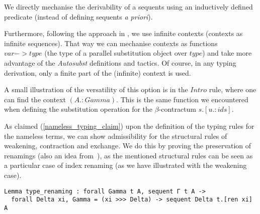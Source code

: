 We directly mechanise the derivability of a sequents using an inductively defined predicate (instead of defining sequents \textit{a priori}).

Furthermore, following the approach in \cite{AutosubstManual}, we use infinite contexts (contexts as infinite sequences).
That way we can mechanise contexts as functions \lst$var->type$ (the type of a parallel substitution object over \lst$type$) and take more advantage of the \textit{Autosubst} definitions and tactics.
Of course, in any typing derivation, only a finite part of the (infinite) context is used.

A small illustration of the versatility of this option is in the \lst$Intro$ rule, where one can find the context \lst$(A.:Gamma)$.
This is the same function we encountered when defining the substitution operation for the $\beta$-contractum \lst$s.[u.:ids]$.

As claimed (\cref{nameless_typing_claim}) upon the definition of the typing rules for the nameless terms, we can show admissibility for the structural rules of weakening, contraction and exchange.
We do this by proving the preservation of renamings (also an idea from~\cite{AutosubstManual}), as the mentioned structural rules can be seen as a particular case of index renaming (as we have illustrated with the weakening case).

\begin{lstlisting}[language=Coq]
Lemma type_renaming : forall Gamma t A, sequent Γ t A ->
  forall Delta xi, Gamma = (xi >>> Delta) -> sequent Delta t.[ren xi] A
\end{lstlisting}
  
